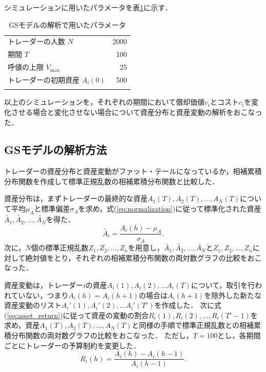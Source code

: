 \documentclass[titlepage]{jsreport}
\begin{document}
シミュレーションに用いたパラメータを表\ref{tbl:Gode_param}に示す．

\begin{table}[htbp]
    \begin{center}
        \caption{GSモデルの解析で用いたパラメータ}
        \begin{tabular}{lr}
            \hline\hline
            トレーダーの人数 $N$          & 2000 \\
            期間 $T$                      & 100  \\
            呼値の上限 $V_\mathrm{max} $  & 25   \\
            トレーダーの初期資産 $A_i(0)$ & 500  \\ \hline
            \label{tbl:Gode_param}
        \end{tabular}
    \end{center}
\end{table}

以上のシミュレーションを，それぞれの期間において償却価値$v_i$とコスト$c_i$を変化させる場合と変化させない場合について資産分布と資産変動の解析をおこなった．

\subsection{GSモデルの解析方法}
トレーダーの資産分布と資産変動がファット・テールになっているか，相補累積分布関数を作成して標準正規乱数の相補累積分布関数と比較した．

資産分布は，まずトレーダーの最終的な資産$A_1(T), A_2(T), ..., A_N(T)$について平均$\mu_A$と標準偏差$\sigma_A$を求め，式(\ref{eq:normalization})に従って標準化された資産$\tilde{A_1}, \tilde{A_2}, ..., \tilde{A_N}$を得た．
\begin{equation}
    \tilde{A_i} = \frac{A_i(h) - \mu_A}{\sigma_A}. \label{eq:normalization}
\end{equation}
次に，$N$個の標準正規乱数$Z_1, Z_2, ..., Z_n$を用意し，$\tilde{A_1}, \tilde{A_2}, ..., \tilde{A_N}$と$Z_1, Z_2, ..., Z_n$に対して絶対値をとり，それぞれの相補累積分布関数の両対数グラフの比較をおこなった．

資産変動は，トレーダー$i$の資産$A_i(1), A_i(2), ...A_i(T)$について，取引を行われていない，つまり$A_i(h) = A_i(h + 1)$の場合は$A_i(h + 1)$を除外した新たな資産変動のリスト$A_i'(1), A_i'(2), ...A_i'(T')$を作成した．
次に式(\ref{eq:asset_return})に従って資産の変動の割合$R_i(1), R_i(2), ..., R_i(T' - 1)$を求め，資産$A_1(T), A_2(T), ..., A_N(T)$と同様の手順で標準正規乱数との相補累積分布関数の両対数グラフの比較をおこなった．
ただし，$T = 100$とし，各期間ごとにトレーダーの予算制約を変更した．
\begin{equation}
    R_i(h) = \frac{A_i(h)-A_i(h - 1)}{A_i(h - 1)}. \label{eq:asset_return}
\end{equation}
\end{document}

